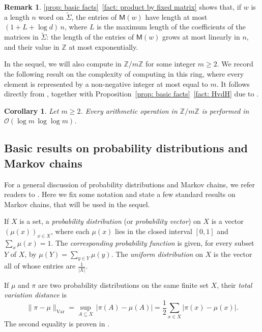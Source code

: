 \documentclass{article}
\def\alph{\tilde{\Sigma}}
\def\O{\mathcal{O}}
\def\Z{\mathbb{Z}}
\def\mat{\textsf{M}}
\theoremstyle{plain}
\newtheorem{corollary}[theorem]{Corollary}
\theoremstyle{definition}
\newtheorem{remark}[theorem]{Remark}
\begin{document}
\begin{remark} \label{rk:coef growth}
\cref{prop: basic facts}~\eqref{fact: product by fixed matrix} shows that, if $w$ is a length $n$ word on $\alph$, the entries of $\mat(w)$ have length at most $(1+L+\log d)\,n$, where $L$ is the maximum length of the coefficients of the matrices in $\alph$: the length of the entries of $\mat(w)$ grows at most linearly in $n$, and their value in $\Z$ at most exponentially.
\end{remark}

In the sequel, we will also compute in $\Z/m\Z$ for some integer $m\ge 2$. We record the following result on the complexity of computing in this ring, where every element is represented by a non-negative integer at most equal to $m$. It follows directly from \cite[Theorem 9.8 and Corollary 9.9]{vzGathenGerhard}, together with Proposition~\ref{prop: basic facts}~\eqref{fact: HvdH} due to \cite{harvey2021integer}.

\begin{corollary}\label{cor: arithmetic mod p}
    Let $m\ge 2$. Every arithmetic operation in $\Z/m\Z$ is performed in $\O(\log m\, \log\log m)$.
\end{corollary}


\subsection{Basic results on probability distributions and Markov chains}\label{sec: markov chains}

For a general discussion of probability distributions and Markov chains, we refer readers to \cite{LevinPeres}. Here we fix some notation and state a few standard results on Markov chains, that will be used in the sequel.

If $X$ is a set, a \emph{probability distribution} (or \emph{probability vector}) on $X$ is a vector $(\mu(x))_{x\in X}$, where each $\mu(x)$ lies in the closed interval $[0,1]$ and $\sum_x\mu(x) = 1$. The \emph{corresponding probability function} is given, for every subset $Y$ of $X$, by $\mu(Y) = \sum_{y\in Y}\mu(y)$. The \emph{uniform distribution} on $X$ is the vector all of whose entries are $\frac1{|X|}$.

If $\mu$ and $\pi$ are two probability distributions on the same finite set $X$, their \emph{total variation distance} is 
%
\begin{equation}\label{eq:var}
\|\pi - \mu\|_{\text{Var}} = \sup_{A\subseteq X}\,|\pi(A) - \mu(A)| = \frac12\sum_{x\in X}|\pi(x)-\mu(x)|.
\end{equation}
%
The second equality is proven in \cite[Proposition 4.2]{LevinPeres}.
\end{document}
